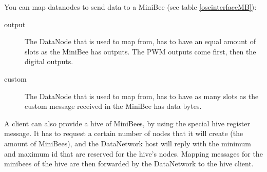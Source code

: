 \documentclass[letterpaper,10pt]{article}
\begin{document}
You can map datanodes to send data to a MiniBee (see table \ref{oscinterfaceMB}):
\begin{description}
 \item [output] The DataNode that is used to map from, has to have an equal amount of slots as the MiniBee has outputs. The PWM outputs come first, then the digital outputs.
 \item [custom] The DataNode that is used to map from, has to have as many slots as the custom message received in the MiniBee has data bytes.
\end{description}

A client can also provide a hive of MiniBees, by using the special hive register message. It has to request a certain number of nodes that it will create (the amount of MiniBees), and the DataNetwork host will reply with the minimum and maximum id that are reserved for the hive's nodes. Mapping messages for the minibees of the hive are then forwarded by the DataNetwork to the hive client.

\end{document}

